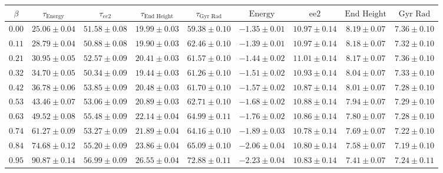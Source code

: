     \begin{sidewaystable}[t!]
        \centering
        \begin{tabular}{|c|c|c|c|c|c|c|c|c|}
            \hline
            $\beta$ & $\tau_{\text{Energy}}$ & $\tau_{ee2}$ & $\tau_{\text{End Height}}$ & $\tau_{\text{Gyr Rad}}$ & $\text{Energy}$ & $\text{ee2}$ & $\text{End Height}$ & $\text{Gyr Rad}$ \\
            \hline
            $0.00$ & $25.06 \pm 0.04$ & $51.58 \pm 0.08$ & $19.99 \pm 0.03$ & $59.38 \pm 0.10$ & $-1.35 \pm 0.01$ & $10.97 \pm 0.14$ & $8.19 \pm 0.07$ & $7.36 \pm 0.10$ \\
            \hline
            $0.11$ & $28.79 \pm 0.04$ & $50.88 \pm 0.08$ & $19.90 \pm 0.03$ & $62.46 \pm 0.10$ & $-1.39 \pm 0.01$ & $10.97 \pm 0.14$ & $8.18 \pm 0.07$ & $7.32 \pm 0.10$ \\
            \hline
            $0.21$ & $30.95 \pm 0.05$ & $52.57 \pm 0.09$ & $20.41 \pm 0.03$ & $61.57 \pm 0.10$ & $-1.44 \pm 0.02$ & $11.01 \pm 0.14$ & $8.17 \pm 0.07$ & $7.36 \pm 0.10$ \\
            \hline
            $0.32$ & $34.70 \pm 0.05$ & $50.34 \pm 0.09$ & $19.44 \pm 0.03$ & $61.26 \pm 0.10$ & $-1.51 \pm 0.02$ & $10.93 \pm 0.14$ & $8.04 \pm 0.07$ & $7.33 \pm 0.10$ \\
            \hline
            $0.42$ & $36.78 \pm 0.06$ & $53.85 \pm 0.09$ & $20.48 \pm 0.03$ & $61.70 \pm 0.10$ & $-1.57 \pm 0.02$ & $10.87 \pm 0.14$ & $8.01 \pm 0.07$ & $7.28 \pm 0.10$ \\
            \hline
            $0.53$ & $43.46 \pm 0.07$ & $53.06 \pm 0.09$ & $20.89 \pm 0.03$ & $62.71 \pm 0.10$ & $-1.68 \pm 0.02$ & $10.88 \pm 0.14$ & $7.94 \pm 0.07$ & $7.29 \pm 0.10$ \\
            \hline
            $0.63$ & $49.52 \pm 0.08$ & $55.48 \pm 0.09$ & $22.14 \pm 0.04$ & $64.99 \pm 0.11$ & $-1.76 \pm 0.02$ & $10.86 \pm 0.14$ & $7.80 \pm 0.07$ & $7.28 \pm 0.10$ \\
            \hline
            $0.74$ & $61.27 \pm 0.09$ & $53.27 \pm 0.09$ & $21.89 \pm 0.04$ & $64.16 \pm 0.10$ & $-1.89 \pm 0.03$ & $10.78 \pm 0.14$ & $7.69 \pm 0.07$ & $7.22 \pm 0.10$ \\
            \hline
            $0.84$ & $74.68 \pm 0.12$ & $55.20 \pm 0.09$ & $23.86 \pm 0.04$ & $65.09 \pm 0.10$ & $-2.06 \pm 0.04$ & $10.80 \pm 0.14$ & $7.58 \pm 0.07$ & $7.19 \pm 0.10$ \\
            \hline
            $0.95$ & $90.87 \pm 0.14$ & $56.99 \pm 0.09$ & $26.55 \pm 0.04$ & $72.88 \pm 0.11$ & $-2.23 \pm 0.04$ & $10.83 \pm 0.14$ & $7.41 \pm 0.07$ & $7.24 \pm 0.11$ \\

\end{tabular}
\end{sidewaystable}
